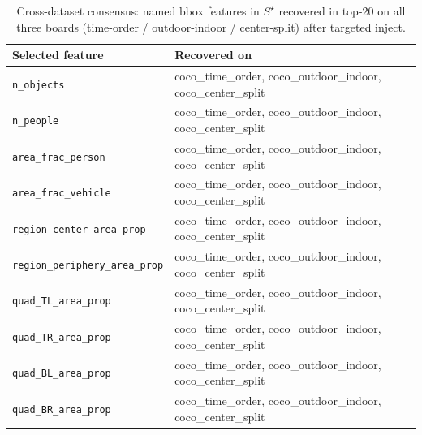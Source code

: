 \begin{table}[ht]
\centering
\caption{Cross-dataset consensus: named bbox features in $S^{\star}$ recovered in top-20 on all three boards (time-order / outdoor-indoor / center-split) after targeted inject.}
\label{tab:bbox-consensus-selected-final}
\small
\begin{tabular}{@{}l l@{}}
\toprule
Selected feature & Recovered on \\
\midrule
\texttt{n\_objects} & coco\_time\_order, coco\_outdoor\_indoor, coco\_center\_split \\
\texttt{n\_people} & coco\_time\_order, coco\_outdoor\_indoor, coco\_center\_split \\
\texttt{area\_frac\_person} & coco\_time\_order, coco\_outdoor\_indoor, coco\_center\_split \\
\texttt{area\_frac\_vehicle} & coco\_time\_order, coco\_outdoor\_indoor, coco\_center\_split \\
\texttt{region\_center\_area\_prop} & coco\_time\_order, coco\_outdoor\_indoor, coco\_center\_split \\
\texttt{region\_periphery\_area\_prop} & coco\_time\_order, coco\_outdoor\_indoor, coco\_center\_split \\
\texttt{quad\_TL\_area\_prop} & coco\_time\_order, coco\_outdoor\_indoor, coco\_center\_split \\
\texttt{quad\_TR\_area\_prop} & coco\_time\_order, coco\_outdoor\_indoor, coco\_center\_split \\
\texttt{quad\_BL\_area\_prop} & coco\_time\_order, coco\_outdoor\_indoor, coco\_center\_split \\
\texttt{quad\_BR\_area\_prop} & coco\_time\_order, coco\_outdoor\_indoor, coco\_center\_split \\
\bottomrule
\end{tabular}
\end{table}
